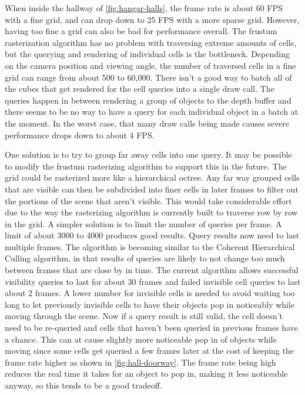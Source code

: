 \documentclass[12pt]{ucthesis}
\begin{document}
When inside the hallway of \ref{fig:hangar-halls}, the frame rate is about 60 FPS with a fine grid, and can drop down to 25 FPS with a more sparse grid.
However, having too fine a grid can also be bad for performance overall.
The frustum rasterization algorithm has no problem with traversing extreme amounts of cells, but the querying and rendering of individual cells is the bottleneck.
Depending on the camera position and viewing angle, the number of traversed cells in a fine grid can range from about 500 to 60,000.
There isn't a good way to batch all of the cubes that get rendered for the cell queries into a single draw call.
The queries happen in between rendering a group of objects to the depth buffer and there seems to be no way to have a query for each individual object in a batch at the moment.
In the worst case, that many draw calls being made causes severe performance drops down to about 4 FPS.

One solution is to try to group far away cells into one query.
It may be possible to modify the frustum rasterizing algorithm to support this in the future.
The grid could be rasterized more like a hierarchical octree.
Any far way grouped cells that are visible can then be subdivided into finer cells in later frames to filter out the portions of the scene that aren't visible.
This would take considerable effort due to the way the rasterizing algorithm is currently built to traverse row by row in the grid.
A simpler solution is to limit the number of queries per frame.
A limit of about 3000 to 4000 produces good results.
Query results now need to last multiple frames.
The algorithm is becoming similar to the Coherent Hierarchical Culling algorithm, in that results of queries are likely to not change too much between frames that are close by in time. 
The current algorithm allows successful visibility queries to last for about 30 frames and failed invisible cell queries to last about 2 frames.
A lower number for invisible cells is needed to avoid waiting too long to let previously invisible cells to have their objects pop in noticeably while moving through the scene.
Now if a query result is still valid, the cell doesn't need to be re-queried and cells that haven't been queried in previous frames have a chance.
This can at cause slightly more noticeable pop in of objects while moving since some cells get queried a few frames later at the cost of keeping the frame rate higher as shown in \ref{fig:hall-doorway}.
The frame rate being high reduces the real time it takes for an object to pop in, making it less noticeable anyway, so this tends to be a good tradeoff.
\end{document}
